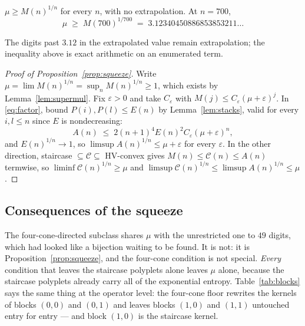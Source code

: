 \documentclass[11pt]{article}
\begin{document}
\begin{corollary}
\label{cor:floor}
$\mu \ge M(n)^{1/n}$ for every $n$, with no extrapolation. At $n = 700$,
\[
  \mu \;\ge\; M(700)^{1/700} \;=\; 3.12340450886853853211\dots
\]
\end{corollary}

The digits past $3.12$ in the extrapolated value remain extrapolation; the
inequality above is exact arithmetic on an enumerated term.

\begin{proof}[Proof of Proposition~\ref{prop:squeeze}]
Write $\mu = \lim M(n)^{1/n} = \sup_n M(n)^{1/n} \ge 1$, which exists by
Lemma~\ref{lem:supermul}. Fix $\varepsilon > 0$ and take $C_\varepsilon$ with
$M(j) \le C_\varepsilon(\mu+\varepsilon)^j$. In \eqref{eq:factor}, bound
$P(i), P(l) \le E(n)$ by Lemma~\ref{lem:stacks}, valid for every $i, l \le n$
since $E$ is nondecreasing:
\[
  A(n) \;\le\; 2(n{+}1)^4 E(n)^2 C_\varepsilon (\mu+\varepsilon)^n ,
\]
and $E(n)^{1/n} \to 1$, so $\limsup A(n)^{1/n} \le \mu + \varepsilon$ for every
$\varepsilon$. In the other direction, staircase $\subseteq \mathcal C
\subseteq$ HV-convex gives $M(n) \le \mathcal C(n) \le A(n)$ termwise, so
$\liminf \mathcal C(n)^{1/n} \ge \mu$ and
$\limsup \mathcal C(n)^{1/n} \le \limsup A(n)^{1/n} \le \mu$.
\end{proof}

\subsection{Consequences of the squeeze}

The four-cone-directed subclass shares $\mu$ with the unrestricted one to $49$
digits, which had looked like a bijection waiting to be found. It is not: it is
Proposition~\ref{prop:squeeze}, and the four-cone condition is not special.
\emph{Every} condition that leaves the staircase polyplets alone leaves $\mu$
alone, because the staircase polyplets already carry all of the exponential
entropy. Table~\ref{tab:blocks} says the same thing at the operator level: the
four-cone floor rewrites the kernels of blocks $(0,0)$ and $(0,1)$ and leaves
blocks $(1,0)$ and $(1,1)$ untouched entry for entry --- and block $(1,0)$ is the
staircase kernel.
\end{document}
